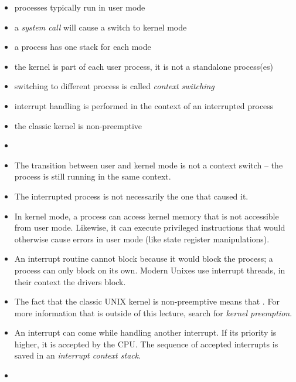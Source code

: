 
\begin{slide}
\begin{itemize}
\item processes typically run in user mode
\item a \emph{system call} will cause a switch to kernel mode
\item a process has one stack for each mode
\item the kernel is part of each user process, it is not a standalone process(es)
\item switching to different process is called \emph{context switching}
\item interrupt handling is performed in the context of an interrupted process
\item the classic kernel is non-preemptive
\end{itemize}
\end{slide}

\begin{itemize}
\item {}
\item The transition between user and kernel mode is not a context switch
-- the process is still running in the same context.
\item The interrupted process is not necessarily the one that caused it.
\item In kernel mode, a process can access kernel memory that is not accessible
from user mode. Likewise, it can execute privileged instructions that would
otherwise cause errors in user mode (like state register manipulations).
\item An interrupt routine cannot block because it would block the process;
a process can only block on its own. Modern Unixes use interrupt threads,
in their context the drivers  block.
\item The fact that the classic UNIX kernel is non-preemptive means that
.  For more information that is
outside of this lecture, search for \emph{kernel preemption}.
\item An interrupt can come while handling another interrupt. If its priority
is higher, it is accepted by the CPU. The sequence of accepted interrupts is
saved in an \emph{interrupt context stack}.
\item {}
\end{itemize}

